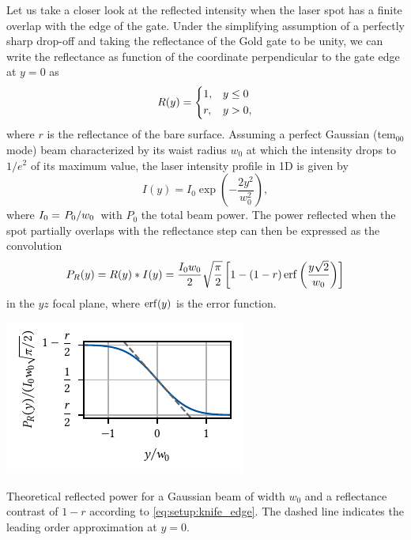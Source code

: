 Let us take a closer look at the reflected intensity when the laser spot has a finite overlap with the edge of the gate.
Under the simplifying assumption of a perfectly sharp drop-off and taking the reflectance of the Gold gate to be unity, we can write the reflectance as function of the coordinate perpendicular to the gate edge at $y=0$ as
\begin{equation}\label{eq:setup:reflectance_step}
    R(y) = \begin{dcases}
        1, & y \leq 0 \\
        r, & y > 0,
    \end{dcases}
\end{equation}
where $r$ is the reflectance of the bare  surface.
Assuming a perfect Gaussian (\gls{tem}$_{00}$ mode) beam characterized by its waist radius $w_0$ at which the intensity drops to $1/e^2$ of its maximum value, the laser intensity profile in 1D is given by
\begin{equation}\label{eq:setup:gaussian}
    I(y) = I_0\exp(-\frac{2y^2}{w_0^2}),
\end{equation}
where $I_0 = \flatfrac{P_0}{w_0}$ with $P_0$ the total beam power.
The power reflected when the spot partially overlaps with the reflectance step can then be expressed as the convolution
\begin{equation}\label{eq:setup:knife_edge}
    P_R(y) = R(y) \ast I(y) = \frac{I_0 w_0}{2}\sqrt{\frac{\pi}{2}}\left[ 1 - (1 - r)\erf\left(\frac{y\sqrt{2}}{w_0}\right) \right]
\end{equation}
in the $yz$ focal plane, where $\erf(y)$ is the error function.

\begin{marginfigure}
    \centering
    \includegraphics{img/pdf/setup/knife_edge_theory}
    \caption[]{
        Theoretical reflected power for a Gaussian beam of width $w_0$ and a reflectance contrast of $1-r$ according to \cref{eq:setup:knife_edge}.
        The dashed line indicates the leading order approximation at $y=0$.
    }
    \label{fig:setup:vibrations:knife_edge:theory}
\end{marginfigure}

